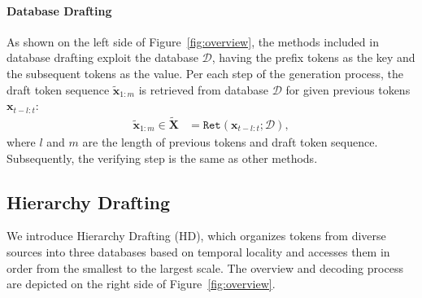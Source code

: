 \paragraph{Database Drafting}
As shown on the left side of Figure~\ref{fig:overview}, the methods included in database drafting exploit the database \(\mathcal{D}\), having the prefix tokens as the key and the subsequent tokens as the value. Per each step of the generation process, the draft token sequence \(\bm{\tilde{x}}_{1:m}\) is retrieved from database \(\mathcal{D}\) for given previous tokens \(\bm{x}_{t-l:t}\):
\begin{align}
    \bm{\tilde{x}}_{1:m} \in \bm{\tilde{X}} &= \texttt{Ret}(\bm{x}_{t-l:t};\mathcal{D}),
\end{align}
where \(l\) and \(m\) are the length of previous tokens and draft token sequence. Subsequently, the verifying step is the same as other methods.

\subsection{Hierarchy Drafting}

We introduce Hierarchy Drafting (HD), which organizes tokens from diverse sources into three databases based on temporal locality and accesses them in order from the smallest to the largest scale. The overview and decoding process are depicted on the right side of Figure~\ref{fig:overview}.



